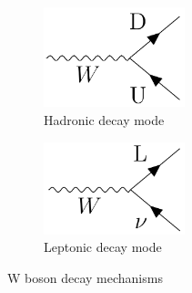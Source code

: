 \begin{figure}[H]
	\centering
	\begin{subfigure}[b]{0.49\textwidth}
	\centering
	\includegraphics[width=0.45\textwidth]{Figures/3/W_had_decay.pdf}
%		 		
	\caption{Hadronic decay mode}
	\label{fig:W_decays_had}
	\end{subfigure}
	\begin{subfigure}[b]{0.49\textwidth}
	\centering
	\includegraphics[width=0.45\textwidth]{Figures/3/W_lep_decay.pdf}
%		 		
	\caption{Leptonic decay mode}
	\label{fig:W_decays_lep}
	\end{subfigure}
	\caption[]{W boson decay mechanisms}
	\label{fig:W_decays}
\end{figure}

